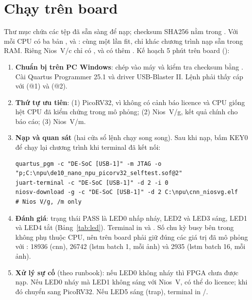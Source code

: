 \section{Chạy trên board}
\label{sec:board}
Thư mục  chứa các tệp  đã sẵn sàng để nạp; checksum SHA256 nằm trong . Với mỗi CPU có ba bản ,  và : cùng một lần fit, chỉ khác chương trình nạp sẵn trong RAM. Riêng Nios~V/c chỉ có , và có thêm . Kế hoạch 5 phút trên board ():
\begin{enumerate}
  \item \textbf{Chuẩn bị trên PC Windows}: chép  vào máy và kiểm tra checksum bằng . Cài Quartus Programmer 25.1 và driver USB-Blaster II. Lệnh  phải thấy cáp  với  (@1) và  (@2).
  \item \textbf{Thứ tự ưu tiên}: (1) PicoRV32, vì không có cảnh báo licence và CPU giống hệt CPU đã kiểm chứng trong mô phỏng; (2) Nios~V/g, kết quả chính cho báo cáo; (3) Nios~V/m.
  \item \textbf{Nạp và quan sát} (hai cửa sổ lệnh chạy song song). Sau khi nạp, bấm KEY0 để chạy lại chương trình khi terminal đã kết nối:
\begin{lstlisting}[style=codebash]
quartus_pgm -c "DE-SoC [USB-1]" -m JTAG -o "p;C:\npu\de10_nano_npu_picorv32_selftest.sof@2"
juart-terminal -c "DE-SoC [USB-1]" -d 2 -i 0
niosv-download -g -c "DE-SoC [USB-1]" -d 2 C:\npu\cnn_niosvg.elf   # Nios V/g, /m only
\end{lstlisting}
  \item \textbf{Đánh giá}: trạng thái PASS là LED0 nhấp nháy, LED2 và LED3 sáng, LED1 và LED4 tắt (Bảng~\ref{tab:led}). Terminal in  và . Số chu kỳ busy bên trong \NPU{} không phụ thuộc CPU, nên trên board phải giữ đúng các giá trị đã mô phỏng với :  \num{18936} (cnn), \num{26742} (lstm batch 1, mỗi ảnh) và \num{2935} (lstm batch 16, mỗi ảnh).
  \item \textbf{Xử lý sự cố} (theo runbook): nếu LED0 không nháy thì FPGA chưa được nạp. Nếu LED0 nháy mà LED1 không sáng với Nios~V, có thể do licence; khi đó chuyển sang PicoRV32. Nếu LED5 sáng (trap), terminal in /.
\end{enumerate}

